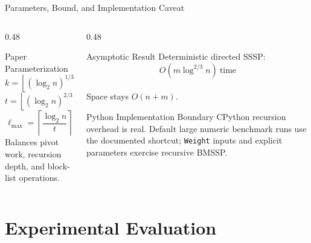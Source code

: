 \documentclass[aspectratio=169]{beamer}
\begin{document}
\begin{frame}{Parameters, Bound, and Implementation Caveat}
  \footnotesize
  \begin{columns}[T]
    \begin{column}{0.48\textwidth}
      \vspace{0.7cm}
      \begin{exampleblock}{Paper Parameterization}
        \[
          k = \left\lfloor (\log_2 n)^{1/3} \right\rfloor
        \]
        \[
          t = \left\lfloor (\log_2 n)^{2/3} \right\rfloor
        \]
        \[
          \ell_{\max} = \left\lceil \frac{\log_2 n}{t} \right\rceil
        \]
        \vspace{2pt}
        Balances pivot work, recursion depth, and block-list operations.
      \end{exampleblock}
    \end{column}
    \begin{column}{0.48\textwidth}
      \begin{block}{Asymptotic Result}
        Deterministic directed SSSP:\medskip
        \[
          O\!\left(m \log^{2/3} n\right)\ \text{time}
        \]
        \\Space stays $O(n+m)$.
      \end{block}
      \begin{alertblock}{Python Implementation Boundary}
        CPython recursion overhead is real. Default large numeric benchmark runs use the documented shortcut; \texttt{Weight} inputs and explicit parameters exercise recursive BMSSP.
      \end{alertblock}
    \end{column}
  \end{columns}
\end{frame}

\section{Experimental Evaluation}
\end{document}

